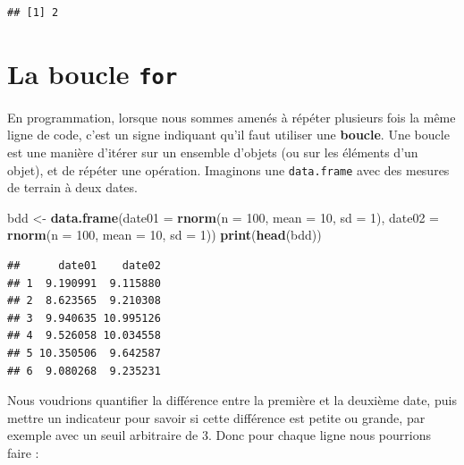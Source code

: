\documentclass[]{book}
\newenvironment{Shaded}{\begin{snugshade}}{\end{snugshade}}
\newcommand{\DataTypeTok}[1]{\textcolor[rgb]{0.13,0.29,0.53}{#1}}
\newcommand{\DecValTok}[1]{\textcolor[rgb]{0.00,0.00,0.81}{#1}}
\newcommand{\KeywordTok}[1]{\textcolor[rgb]{0.13,0.29,0.53}{\textbf{#1}}}
\newcommand{\NormalTok}[1]{#1}
\newcommand{\StringTok}[1]{\textcolor[rgb]{0.31,0.60,0.02}{#1}}
\begin{document}
\begin{verbatim}
## [1] 2
\end{verbatim}

\hypertarget{l17for}{%
\section{\texorpdfstring{La boucle \texttt{for}}{La boucle for}}\label{l17for}}

En programmation, lorsque nous sommes amenés à répéter plusieurs fois la même ligne de code, c'est un signe indiquant qu'il faut utiliser une \textbf{boucle}. Une boucle est une manière d'itérer sur un ensemble d'objets (ou sur les éléments d'un objet), et de répéter une opération. Imaginons une \texttt{data.frame} avec des mesures de terrain à deux dates.

\begin{Shaded}
\begin{Highlighting}[]
\NormalTok{bdd <-}\StringTok{ }\KeywordTok{data.frame}\NormalTok{(}\DataTypeTok{date01 =} \KeywordTok{rnorm}\NormalTok{(}\DataTypeTok{n =} \DecValTok{100}\NormalTok{, }\DataTypeTok{mean =} \DecValTok{10}\NormalTok{, }\DataTypeTok{sd =} \DecValTok{1}\NormalTok{), }
                  \DataTypeTok{date02 =} \KeywordTok{rnorm}\NormalTok{(}\DataTypeTok{n =} \DecValTok{100}\NormalTok{, }\DataTypeTok{mean =} \DecValTok{10}\NormalTok{, }\DataTypeTok{sd =} \DecValTok{1}\NormalTok{))}
\KeywordTok{print}\NormalTok{(}\KeywordTok{head}\NormalTok{(bdd))}
\end{Highlighting}
\end{Shaded}

\begin{verbatim}
##      date01    date02
## 1  9.190991  9.115880
## 2  8.623565  9.210308
## 3  9.940635 10.995126
## 4  9.526058 10.034558
## 5 10.350506  9.642587
## 6  9.080268  9.235231
\end{verbatim}

Nous voudrions quantifier la différence entre la première et la deuxième date, puis mettre un indicateur pour savoir si cette différence est petite ou grande, par exemple avec un seuil arbitraire de 3. Donc pour chaque ligne nous pourrions faire :
\end{document}
